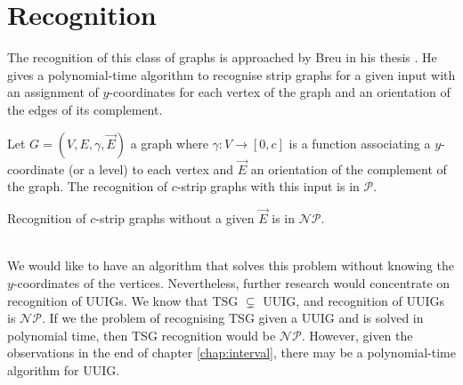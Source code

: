 \section{Recognition}

The recognition of this class of graphs is approached by Breu in his thesis \cite{breuAlgorithmicAspectsConstrained1996}. He gives a polynomial-time algorithm to recognise strip graphs for a given input with an assignment of $y$-coordinates for each vertex of the graph and an orientation of the edges of its complement.

\begin{theorem}
  Let $G = (V,E,\gamma,\overrightarrow{E})$ a graph where $\gamma: V \to [0,c]$ is a function associating a $y$-coordinate (or a level) to each vertex and $\overrightarrow{E}$ an orientation of the complement of the graph. The recognition of $c$-strip graphs with this input is in $\mathcal{P}$.
\end{theorem}

\begin{obs}
  Recognition of $c$-strip graphs without a given $\overrightarrow{E}$ is in $\mathcal{NP}$.
\end{obs}

\\

We would like to have an algorithm that solves this problem without knowing the $y$-coordinates of the vertices. Nevertheless, further research would concentrate on recognition of UUIGs. We know that TSG $\subsetneq$ UUIG, and recognition of UUIGs is $\mathcal{NP}$. If we the problem of recognising TSG given a UUIG and is solved in polynomial time, then TSG recognition would be $\mathcal{NP}$. However, given the observations in the end of chapter \ref{chap:interval}, there may be a polynomial-time algorithm for UUIG.

